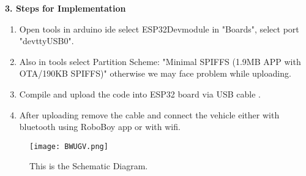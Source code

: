 \documentclass[12pt]{article}
\begin{document}
\begin{multicols}{2}
\vspace{1em}
\noindent\textbf{3. Steps for Implementation}
\begin{enumerate}
    \item Open tools in arduino ide select ESP32Devmodule in "Boards", select port "devttyUSB0".
    \item Also in tools select Partition Scheme: "Minimal SPIFFS (1.9MB APP with OTA/190KB SPIFFS)" otherwise we may face problem while uploading.
    \item Compile and upload the code into ESP32 board via USB cable .
    \item After uploading remove the cable and connect the vehicle either with bluetooth using RoboBoy app or with wifi.
\end{enumerate}

\vspace{1em}

\end{multicols}
\vspace{4em}
\vspace{1em}
\begin{multicols}{2}
\begin{figure}[H]
    \centering
    \texttt{[image: BWUGV.png]}
    \caption{This is the Schematic Diagram.}
    \label{fig:image1}
\end{figure}

\end{multicols}
\end{document}
